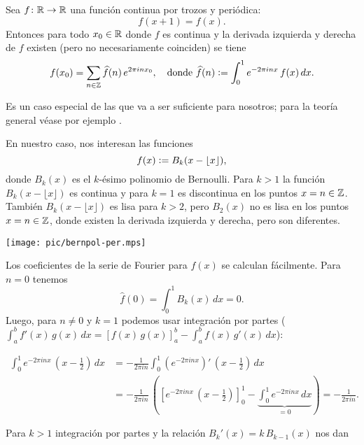 \documentclass{article}
\numberwithin{equation}{section}
\theoremstyle{definition}
\begin{document}
\begin{hecho}
  Sea $f\colon \mathbb{R} \to \mathbb{R}$ una función continua por trozos y periódica:
  $$f (x+1) = f (x).$$
  Entonces para todo $x_0\in \mathbb{R}$ donde $f$ es continua y la derivada izquierda
  y derecha de $f$ existen (pero no necesariamente coinciden) se tiene
  \[ f (x_0) = \sum_{n\in\mathbb{Z}} \widehat{f} (n) \, e^{2\pi i n x_0}, \quad
    \text{donde }\widehat{f} (n) \mathrel{\mathop:}= \int_0^1 e^{-2\pi i n x} \, f(x) \, dx. \]
\end{hecho}

Es un caso especial de las  que va a ser suficiente para
nosotros; para la teoría general véase por ejemplo \cite{Katznelson-2004}.

\vspace{1em}

En nuestro caso, nos interesan las funciones
$$f (x) \mathrel{\mathop:}= B_k (x - \lfloor x\rfloor),$$
donde $B_k (x)$ es el $k$-ésimo polinomio de Bernoulli. Para $k > 1$ la función
$B_k (x - \lfloor x\rfloor)$ es continua y para $k = 1$ es discontinua en
los puntos $x = n \in \mathbb{Z}$. También $B_k (x - \lfloor x\rfloor)$ es lisa para
$k > 2$, pero $B_2 (x)$ no es lisa en los puntos $x = n \in \mathbb{Z}$, donde existen
la derivada izquierda y derecha, pero son diferentes.

\begin{center}
  \texttt{[image: pic/bernpol-per.mps]}
\end{center}

Los coeficientes de la serie de Fourier para $f (x)$ se calculan
fácilmente. Para $n = 0$ tenemos
$$\widehat{f} (0) = \int_0^1 B_k (x)\,dx = 0.$$
Luego, para $n \ne 0$ y $k = 1$ podemos usar integración por partes
($\int_a^b f'(x)\,g(x)\,dx = \left[f(x)\,g(x)\right]_a^b - \int_a^b f(x) \, g'(x)\,dx$):

\begin{align*}
  \int_0^1 e^{-2\pi i n x}\,\left(x - \frac{1}{2}\right)\,dx & = -\frac{1}{2\pi i n} \int_0^1 \left(e^{-2\pi i n x}\right)' \, \left(x - \frac{1}{2}\right)\,dx \\
                                                             & = -\frac{1}{2\pi i n} \, \left( \left[e^{-2\pi i n x}\,\left(x - \frac{1}{2}\right)\right]^1_0 - \underbrace{\int_0^1 e^{-2\pi i n x}\,dx}_{=0} \right) = -\frac{1}{2\pi i n}.
\end{align*}

Para $k > 1$ integración por partes y la relación $B_k' (x) = k\,B_{k-1} (x)$
nos dan
\end{document}

